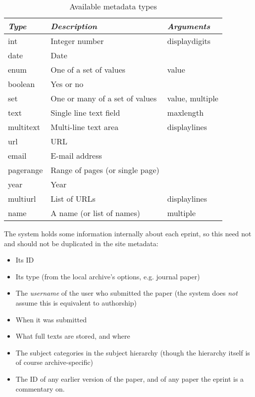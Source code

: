 \begin{table}
\begin{center}
\begin{tabular}{|l|l|l|}
\hline
\emph{Type} & \emph{Description}              & \emph{Arguments} \\
\hline
int         & Integer number                  & displaydigits    \\
date        & Date                            &                  \\
enum        & One of a set of values          & value            \\
boolean     & Yes or no                       &                  \\
set         & One or many of a set of values  & value, multiple  \\
text        & Single line text field          & maxlength        \\
multitext   & Multi-line text area            & displaylines     \\
url         & URL                             &                  \\
email       & E-mail address                  &                  \\
pagerange   & Range of pages (or single page) &                  \\
year        & Year                            &                  \\
multiurl    & List of URLs                    & displaylines     \\
name        & A name (or list of names)       & multiple         \\
\hline
\end{tabular}
\caption{\label{install_meta_types} Available metadata types}
\end{center}
\end{table}

The system holds some information internally about each eprint, so this need not and should not be duplicated in the site metadata:

\begin{itemize}
\item Its ID
\item Its type (from the local archive's options, e.g. journal paper)
\item The \emph{username} of the user who submitted the paper (the system does \emph{not} assume this is equivalent to authorship)
\item When it was submitted
\item What full texts are stored, and where
\item The subject categories in the subject hierarchy (though the hierarchy itself is of course archive-specific)
\item The ID of any earlier version of the paper, and of any paper the eprint is a commentary on.
\end{itemize}

